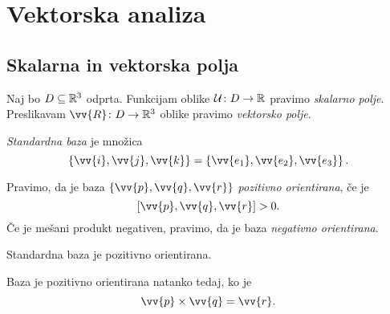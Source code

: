 \section{Vektorska analiza}

\subsection{Skalarna in vektorska polja}

\begin{definicija}
Naj bo $D \subseteq \mathbb{R}^3$ odprta. Funkcijam oblike
$\mathcal{U} \colon D \to \mathbb{R}$ pravimo
\emph{skalarno polje}. Preslikavam
$\vv{R} \colon D \to \R^3$ oblike pravimo \emph{vektorsko polje}.
\end{definicija}

\begin{definicija}
\emph{Standardna baza} je množica
\[
\set{\vv{i}, \vv{j}, \vv{k}} = \set{\vv{e_1}, \vv{e_2}, \vv{e_3}}.
\]
\end{definicija}

\begin{definicija}
Pravimo, da je baza $\set{\vv{p}, \vv{q}, \vv{r}}$
\emph{pozitivno orientirana}, če je
\[
[\vv{p}, \vv{q}, \vv{r}] > 0.
\]
Če je mešani produkt negativen, pravimo, da je baza
\emph{negativno orientirana}.
\end{definicija}

\begin{opomba}
Standardna baza je pozitivno orientirana.
\end{opomba}

\begin{opomba}
Baza je pozitivno orientirana natanko tedaj, ko je
\[
\vv{p} \times \vv{q} = \vv{r}.
\]
\end{opomba}
